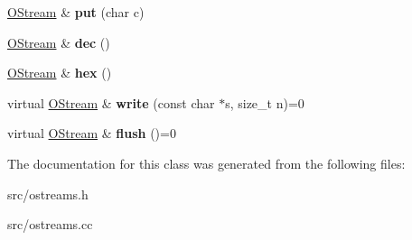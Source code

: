\begin{DoxyCompactItemize}
\item 
\hypertarget{classv8_1_1internal_1_1_o_stream_acb02d8a9000617a4c48643019b7e404c}{}\hyperlink{classv8_1_1internal_1_1_o_stream}{O\+Stream} \& {\bfseries put} (char c)\label{classv8_1_1internal_1_1_o_stream_acb02d8a9000617a4c48643019b7e404c}

\item 
\hypertarget{classv8_1_1internal_1_1_o_stream_a5058baaaa5a706b587c42e1fbc15f023}{}\hyperlink{classv8_1_1internal_1_1_o_stream}{O\+Stream} \& {\bfseries dec} ()\label{classv8_1_1internal_1_1_o_stream_a5058baaaa5a706b587c42e1fbc15f023}

\item 
\hypertarget{classv8_1_1internal_1_1_o_stream_a1fe0ddb6b2159102131f1c15b51b3752}{}\hyperlink{classv8_1_1internal_1_1_o_stream}{O\+Stream} \& {\bfseries hex} ()\label{classv8_1_1internal_1_1_o_stream_a1fe0ddb6b2159102131f1c15b51b3752}

\item 
\hypertarget{classv8_1_1internal_1_1_o_stream_ae51c4e0f0e8519fc715137923ba3be39}{}virtual \hyperlink{classv8_1_1internal_1_1_o_stream}{O\+Stream} \& {\bfseries write} (const char $\ast$s, size\+\_\+t n)=0\label{classv8_1_1internal_1_1_o_stream_ae51c4e0f0e8519fc715137923ba3be39}

\item 
\hypertarget{classv8_1_1internal_1_1_o_stream_a4955929a24430c3002e96b6b00694ee9}{}virtual \hyperlink{classv8_1_1internal_1_1_o_stream}{O\+Stream} \& {\bfseries flush} ()=0\label{classv8_1_1internal_1_1_o_stream_a4955929a24430c3002e96b6b00694ee9}

\end{DoxyCompactItemize}


The documentation for this class was generated from the following files\+:\begin{DoxyCompactItemize}
\item 
src/ostreams.\+h\item 
src/ostreams.\+cc\end{DoxyCompactItemize}
